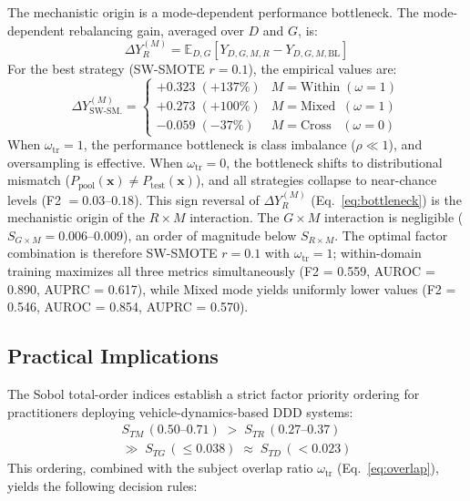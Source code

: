 \documentclass[lettersize,journal]{IEEEtran}
\begin{document}
The mechanistic origin is a mode-dependent performance bottleneck.
The mode-dependent rebalancing gain, averaged over $D$ and $G$, is:
\begin{equation}
\label{eq:rebalancing_gain}
\Delta Y_R^{(M)} = \mathbb{E}_{D,G}\!\left[Y_{D,G,M,R} - Y_{D,G,M,\mathrm{BL}}\right]
\end{equation}
For the best strategy (SW-SMOTE $r{=}0.1$), the empirical values are:
\begin{equation}
\label{eq:bottleneck}
\Delta Y_{\text{SW-SM.}}^{(M)} =
\begin{cases}
+0.323\;(+137\%) & M = \mathrm{Within}\;(\omega = 1) \\
+0.273\;(+100\%) & M = \mathrm{Mixed}\;\;(\omega = 1) \\
-0.059\;(-37\%)   & M = \mathrm{Cross}\;\;\;(\omega = 0)
\end{cases}
\end{equation}
When $\omega_{\mathrm{tr}} = 1$, the performance bottleneck is class imbalance ($\rho \ll 1$), and oversampling is effective.
When $\omega_{\mathrm{tr}} = 0$, the bottleneck shifts to distributional mismatch ($P_{\mathrm{pool}}(\mathbf{x}) \neq P_{\mathrm{test}}(\mathbf{x})$), and all strategies collapse to near-chance levels (F2 $= 0.03$--$0.18$).
This sign reversal of $\Delta Y_R^{(M)}$ (Eq.~\eqref{eq:bottleneck}) is the mechanistic origin of the $R \times M$ interaction.
The $G \times M$ interaction is negligible ($S_{G \times M} = 0.006$--$0.009$), an order of magnitude below $S_{R \times M}$.
The optimal factor combination is therefore SW-SMOTE $r{=}0.1$ with $\omega_{\mathrm{tr}} = 1$; within-domain training maximizes all three metrics simultaneously (F2 = 0.559, AUROC = 0.890, AUPRC = 0.617), while Mixed mode yields uniformly lower values (F2 = 0.546, AUROC = 0.854, AUPRC = 0.570).

\subsection{Practical Implications}
The Sobol total-order indices establish a strict factor priority ordering for practitioners deploying vehicle-dynamics-based DDD systems:
\begin{multline}
\label{eq:priority}
S_{TM}\,(0.50\text{--}0.71) \;>\; S_{TR}\,(0.27\text{--}0.37) \\
\gg\; S_{TG}\,({\leq}0.038) \;\approx\; S_{TD}\,({<}0.023)
\end{multline}
This ordering, combined with the subject overlap ratio $\omega_{\mathrm{tr}}$ (Eq.~\eqref{eq:overlap}), yields the following decision rules:
\end{document}
